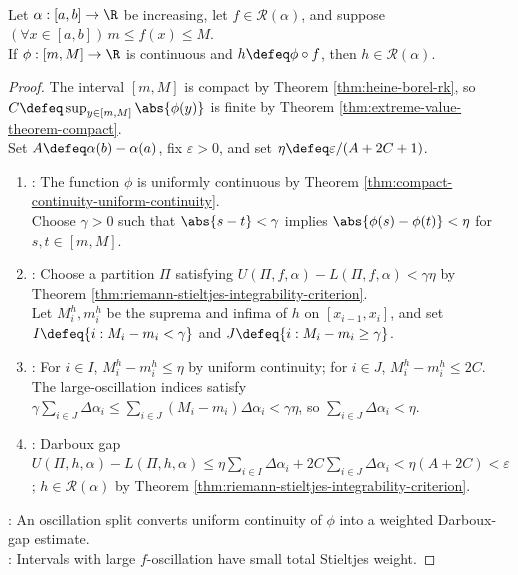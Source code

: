 \begin{theorem} \label{thm:continuous-composition-preserves-riemann-stieltjes-integrability} \\
Let $\alpha:[a,b]\to\R$ be increasing, let $f\in\mathcal{R}(\alpha)$, and suppose $(\forall x\in[a,b])\,m\leq f(x)\leq M$.\\
If $\phi:[m,M]\to\R$ is continuous and $h\defeq\phi\circ f$, then $h\in\mathcal{R}(\alpha)$.
\begin{proof}
The interval $[m,M]$ is compact by Theorem \ref{thm:heine-borel-rk}, so $C\defeq\sup_{y\in[m,M]}\abs{\phi(y)}$ is finite by Theorem \ref{thm:extreme-value-theorem-compact}.\\
Set $A\defeq\alpha(b)-\alpha(a)$, fix $\varepsilon>0$, and set $\eta\defeq\varepsilon/(A+2C+1)$.
\begin{enumerate}[label=(\roman*)]
\setlength{\itemsep}{0pt}
\item {}: The function $\phi$ is uniformly continuous by Theorem \ref{thm:compact-continuity-uniform-continuity}.\\
Choose $\gamma>0$ such that $\abs{s-t}<\gamma$ implies $\abs{\phi(s)-\phi(t)}<\eta$ for $s,t\in[m,M]$.
\item {}: Choose a partition $\Pi$ satisfying $U(\Pi,f,\alpha)-L(\Pi,f,\alpha)<\gamma\eta$ by Theorem \ref{thm:riemann-stieltjes-integrability-criterion}.\\
Let $M_i^h,m_i^h$ be the suprema and infima of $h$ on $[x_{i-1},x_i]$, and set $I\defeq\{i:M_i-m_i<\gamma\}$ and $J\defeq\{i:M_i-m_i\geq\gamma\}$.
\item {}: For $i\in I$, $M_i^h-m_i^h\leq\eta$ by uniform continuity; for $i\in J$, $M_i^h-m_i^h\leq2C$.\\
The large-oscillation indices satisfy $\gamma\sum\limits_{i\in J}\Delta\alpha_i \leq\sum\limits_{i\in J}(M_i-m_i)\Delta\alpha_i <\gamma\eta$, so $\sum\limits_{i\in J}\Delta\alpha_i<\eta$.
\item {}: Darboux gap $U(\Pi,h,\alpha)-L(\Pi,h,\alpha) \leq\eta\sum\limits_{i\in I}\Delta\alpha_i +2C\sum\limits_{i\in J}\Delta\alpha_i <\eta(A+2C)<\varepsilon$; $h\in\mathcal{R}(\alpha)$ by Theorem \ref{thm:riemann-stieltjes-integrability-criterion}.
\end{enumerate}
: An oscillation split converts uniform continuity of $\phi$ into a weighted Darboux-gap estimate.\\
: Intervals with large $f$-oscillation have small total Stieltjes weight.
\end{proof}
\end{theorem}

